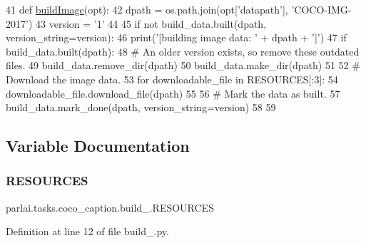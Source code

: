 \begin{DoxyCode}
41 \textcolor{keyword}{def }\hyperlink{namespaceparlai_1_1tasks_1_1coco__caption_1_1build__2017_ae85e762d86aa89bda50b2f9b6df4f112}{buildImage}(opt):
42     dpath = os.path.join(opt[\textcolor{stringliteral}{'datapath'}], \textcolor{stringliteral}{'COCO-IMG-2017'})
43     version = \textcolor{stringliteral}{'1'}
44 
45     \textcolor{keywordflow}{if} \textcolor{keywordflow}{not} build\_data.built(dpath, version\_string=version):
46         print(\textcolor{stringliteral}{'[building image data: '} + dpath + \textcolor{stringliteral}{']'})
47         \textcolor{keywordflow}{if} build\_data.built(dpath):
48             \textcolor{comment}{# An older version exists, so remove these outdated files.}
49             build\_data.remove\_dir(dpath)
50         build\_data.make\_dir(dpath)
51 
52         \textcolor{comment}{# Download the image data.}
53         \textcolor{keywordflow}{for} downloadable\_file \textcolor{keywordflow}{in} RESOURCES[:3]:
54             downloadable\_file.download\_file(dpath)
55 
56         \textcolor{comment}{# Mark the data as built.}
57         build\_data.mark\_done(dpath, version\_string=version)
58 
59 
\end{DoxyCode}


\subsection{Variable Documentation}
\mbox{\label{namespaceparlai_1_1tasks_1_1coco__caption_1_1build__2017_a7201b2ff2bd7703f346e9ea9d9d7895f}} 
\subsubsection{\texorpdfstring{R\+E\+S\+O\+U\+R\+C\+ES}{RESOURCES}}
{\footnotesize\ttfamily parlai.\+tasks.\+coco\+\_\+caption.\+build\+\_.\+R\+E\+S\+O\+U\+R\+C\+ES}



Definition at line 12 of file build\+\_.\+py.


